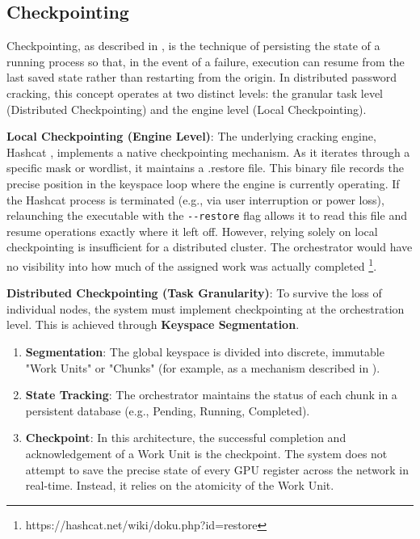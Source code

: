 \subsection{Checkpointing}

Checkpointing, as described in \cite{checkpointing}, is the technique of persisting the state of a running process so that, in the event of a failure, execution can resume from the last saved state rather than restarting from the origin. In distributed password cracking, this concept operates at two distinct levels: the granular task level (Distributed Checkpointing) and the engine level (Local Checkpointing).

\textbf{Local Checkpointing (Engine Level)}: The underlying cracking engine, Hashcat \cite{hashcat_wiki}, implements a native checkpointing mechanism. As it iterates through a specific mask or wordlist, it maintains a .restore file. This binary file records the precise position in the keyspace loop where the engine is currently operating. If the Hashcat process is terminated (e.g., via user interruption or power loss), relaunching the executable with the \verb|--restore| flag allows it to read this file and resume operations exactly where it left off. However, relying solely on local checkpointing is insufficient for a distributed cluster. The orchestrator would have no visibility into how much of the assigned work was actually completed \footnote{https://hashcat.net/wiki/doku.php?id=restore}.

\textbf{Distributed Checkpointing (Task Granularity)}: To survive the loss of individual nodes, the system must implement checkpointing at the orchestration level. This is achieved through \textbf{Keyspace Segmentation}.

\begin{enumerate}
    \item \textbf{Segmentation}: The global keyspace is divided into discrete, immutable "Work Units" or "Chunks" (for example, as a mechanism described in \cite{BUT168182}).

    \item \textbf{State Tracking}: The orchestrator maintains the status of each chunk in a persistent database (e.g., Pending, Running, Completed).

    \item \textbf{Checkpoint}: In this architecture, the successful completion and acknowledgement of a Work Unit is the checkpoint. The system does not attempt to save the precise state of every GPU register across the network in real-time. Instead, it relies on the atomicity of the Work Unit.
\end{enumerate}

